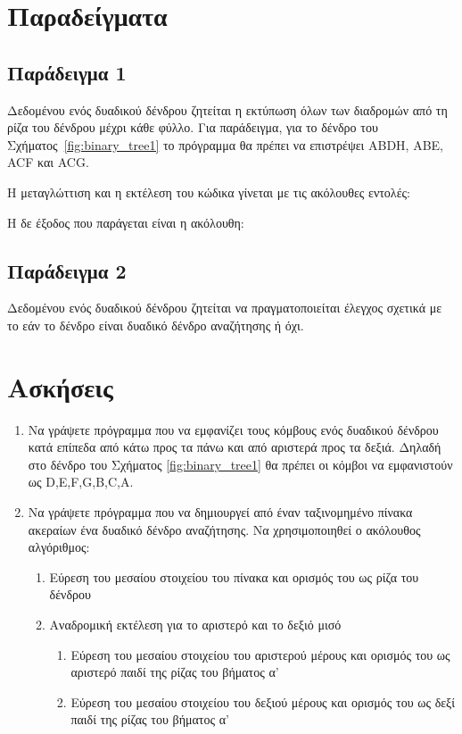 \section{Παραδείγματα}

\subsection{Παράδειγμα 1}

Δεδομένου ενός δυαδικού δένδρου ζητείται η εκτύπωση όλων των διαδρομών από τη ρίζα του δένδρου μέχρι κάθε φύλλο. Για παράδειγμα, για το δένδρο του Σχήματος~\ref{fig:binary_tree1} το πρόγραμμα θα πρέπει να επιστρέψει ABDH, ABE, ACF και ACG.



Η μεταγλώττιση και η εκτέλεση του κώδικα γίνεται με τις ακόλουθες εντολές:



Η δε έξοδος που παράγεται είναι η ακόλουθη:




\subsection{Παράδειγμα 2}

Δεδομένου ενός δυαδικού δένδρου ζητείται να πραγματοποιείται έλεγχος σχετικά με το εάν το δένδρο είναι δυαδικό δένδρο αναζήτησης ή όχι. 

\section{Ασκήσεις}

\begin{enumerate}
\item Να γράψετε πρόγραμμα που να εμφανίζει τους κόμβους ενός δυαδικού δένδρου κατά επίπεδα από κάτω προς τα πάνω και από αριστερά προς τα δεξιά. Δηλαδή στο δένδρο του Σχήματος \ref{fig:binary_tree1} θα πρέπει οι κόμβοι να εμφανιστούν ως D,E,F,G,B,C,A.
\item Να γράψετε πρόγραμμα που να δημιουργεί από έναν ταξινομημένο πίνακα ακεραίων ένα δυαδικό δένδρο αναζήτησης. Να χρησιμοποιηθεί ο ακόλουθος αλγόριθμος:
	\begin{enumerate}
	\item Εύρεση του μεσαίου στοιχείου του πίνακα και ορισμός του ως ρίζα του δένδρου
	\item Αναδρομική εκτέλεση για το αριστερό και το δεξιό μισό
		\begin{enumerate}
		\item Εύρεση του μεσαίου στοιχείου του αριστερού μέρους και ορισμός του ως 		αριστερό παιδί της ρίζας του βήματος α'
		\item Εύρεση του μεσαίου στοιχείου του δεξιού μέρους και ορισμός του ως δεξί παιδί της ρίζας του βήματος α'
		\end{enumerate}
	\end{enumerate}
\end{enumerate}

